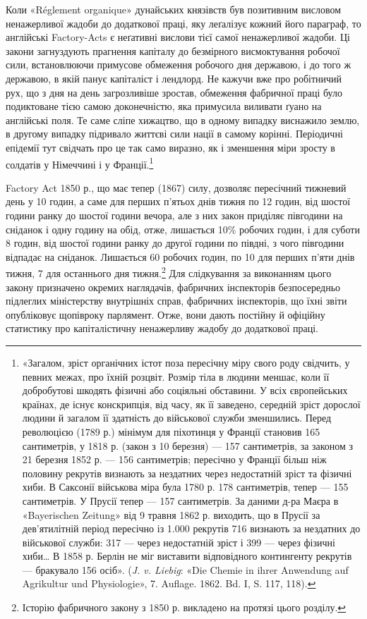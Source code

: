 Коли «Réglement organique» дунайських князівств був позитивним
висловом ненажерливої жадоби до додаткової праці, яку
леґалізує кожний його параграф, то англійські Factory-Acts
є неґативні вислови тієї самої ненажерливої жадоби. Ці закони
загнуздують прагнення капіталу до безмірного висмоктування
робочої сили, встановлюючи примусове обмеження робочого дня
державою, і до того ж державою, в якій панує капіталіст і лендлорд.
Не кажучи вже про робітничий рух, що з дня на день загрозливіше
зростав, обмеження фабричної праці було подиктоване
тією самою доконечністю, яка примусила виливати ґуано
на англійські поля. Те саме сліпе хижацтво, що в одному випадку
виснажило землю, в другому випадку підривало життєві сили
нації в самому корінні. Періодичні епідемії тут свідчать про це
так само виразно, як і зменшення міри зросту в солдатів у Німеччині
і у Франції.\footnote{
«Загалом, зріст органічних істот поза пересічну міру свого роду
свідчить, у певних межах, про їхній розцвіт. Розмір тіла в людини меншає,
коли її добробутові шкодять фізичні або соціяльні обставини. У всіх європейських
країнах, де існує конскрипція, від часу, як її заведено, середній
зріст дорослої людини й загалом її здатність до військової служби зменшились.
Перед революцією (1789 р.) мінімум для піхотинця у Франції
становив 165 сантиметрів, у 1818 р. (закон з 10 березня) — 157 сантиметрів,
за законом з 21 березня 1852 р. — 156 сантиметрів; пересічно у Франції
більш ніж половину рекрутів визнають за нездатних через недостатній
зріст та фізичні хиби. В Саксонії військова міра була 1780 р. 178 сантиметрів,
тепер — 155 сантиметрів. У Прусії тепер — 157 сантиметрів. За даними
д-ра Маєра в «Bayerischen Zeitung» від 9 травня 1862 р. виходить,
що в Прусії за дев’ятилітній період пересічно із 1.000 рекрутів 716 визнають
за нездатних до військової служби: 317 — через недостатній зріст і
399 — через фізичні хиби\dots{} В 1858 р. Берлін не міг виставити відповідного
контингенту рекрутів — бракувало 156 осіб». (\emph{J. v. Liebig}: «Die
Chemie in ihrer Anwendung auf Agrikultur und Physiologie», 7. Auflage.
1862. Bd. I, S. 117, 118).
}

Factory Act 1850 р., що має тепер (1867) силу, дозволяє пересічний
тижневий день у 10 годин, а саме для перших п’ятьох
днів тижня по 12 годин, від шостої години ранку до шостої години
вечора, але з них закон приділяє півгодини на сніданок і
одну годину на обід, отже, лишається 10\% робочих годин, і для
суботи 8 годин, від шостої години ранку до другої години по
півдні, з чого півгодини відпадає на сніданок. Лишається 60 робочих
годин, по 10 для перших п’яти днів тижня, 7 для
останнього дня тижня.\footnote{
Історію фабричного закону з 1850 р. викладено на протязі цього
розділу.
} Для слідкування за виконанням цього
закону призначено окремих наглядачів, фабричних інспекторів
безпосередньо підлеглих міністерству внутрішніх справ, фабричних
інспекторів, що їхні звіти опубліковує щопівроку парлямент.
Отже, вони дають постійну й офіційну статистику про капіталістичну
ненажерливу жадобу до додаткової праці.


